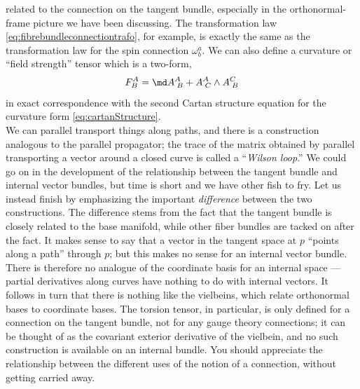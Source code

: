 related to the connection on the tangent bundle, especially in the orthonormal-frame picture
we have been discussing. The transformation law \ref{eq:fibrebundleconnectiontrafo}, for example, is exactly the same
as the transformation law for the spin connection $\omega^a_b$. We can also define a curvature or
“field strength” tensor which is a two-form,
\begin{equation}
F^A_B = \md A^A_{\;B} + A^A_{\;C} \wedge A^C_{\;B}
\end{equation}
in exact correspondence with the second Cartan structure equation for the curvature form \ref{eq:cartanStructure}.\\
We can parallel transport things along paths, and
there is a construction analogous to the parallel propagator; the trace of the matrix obtained
by parallel transporting a vector around a closed curve is called a “\emph{Wilson loop}.”
We could go on in the development of the relationship between the tangent bundle and
internal vector bundles, but time is short and we have other fish to fry. Let us instead finish
by emphasizing the important \emph{difference} between the two constructions. The difference
stems from the fact that the tangent bundle is closely related to the base manifold, while
other fiber bundles are tacked on after the fact. It makes sense to say that a vector in the
tangent space at $p$ “points along a path” through $p$; but this makes no sense for an internal
vector bundle. There is therefore no analogue of the coordinate basis for an internal space —
partial derivatives along curves have nothing to do with internal vectors. It follows in turn
that there is nothing like the vielbeins, which relate orthonormal bases to coordinate bases.
The torsion tensor, in particular, is only defined for a connection on the tangent bundle, not
for any gauge theory connections; it can be thought of as the covariant exterior derivative
of the vielbein, and no such construction is available on an internal bundle. You should
appreciate the relationship between the different uses of the notion of a connection, without
getting carried away.


















































